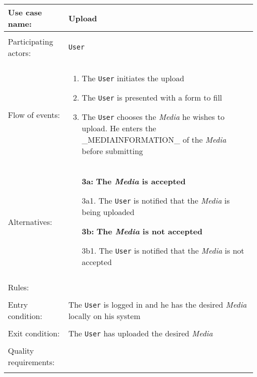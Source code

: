 \documentclass[../report.tex]{subfiles}
\begin{document}
\noindent
\begin{tabular}{ l p{8cm} }                      
 Use case name:  & Upload   \\   \hline \\               
 Participating actors:  & \texttt{User} \\   \hline \\         
 Flow of events: & \begin{enumerate}
\item{The \texttt{User} initiates the upload}
\item{The \texttt{User} is presented with a form to fill}
\item{The \texttt{User} chooses the \textit{Media} he wishes to upload. He enters the \_MEDIAINFORMATION\_ of the \textit{Media} before submitting}
\end{enumerate} \\
Alternatives: & \begin{itemize}
\item[\textbf{3a:}] \textbf{The \textit{Media} is accepted}
\item[]  3a1. The \texttt{User} is notified that the \textit{Media} is being uploaded
\item[\textbf{3b:}] \textbf{The \textit{Media} is not accepted}
\item[]  3b1. The \texttt{User} is notified that the \textit{Media} is not accepted
\end{itemize}
 \\   \hline \\
Rules: & \\ \hline \\
Entry condition: & The \texttt{User} is logged in and he has the desired \textit{Media} locally on his system \\ \hline \\
Exit condition: & The \texttt{User} has uploaded the desired \textit{Media} \\ \hline \\
Quality requirements: & \\ \hline \\ %
\end{tabular} \\
\end{document}
